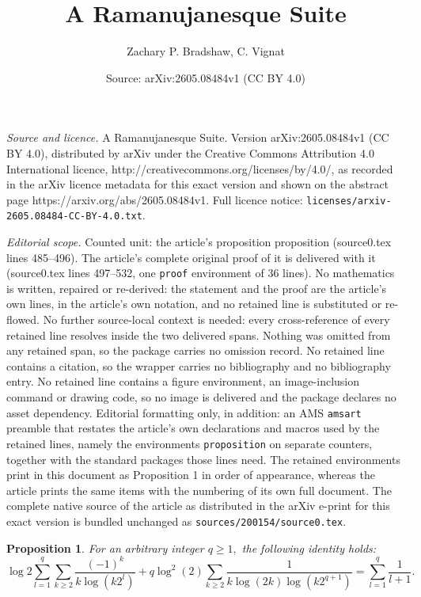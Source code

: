 \documentclass[10pt,a4paper]{amsart}
\title{A Ramanujanesque Suite}
\author{Zachary P. Bradshaw, C. Vignat}
\date{Source: arXiv:2605.08484v1 (CC BY 4.0)}
\newtheorem{proposition}{Proposition}
\begin{document}
\maketitle

\noindent\emph{Source and licence.} A Ramanujanesque Suite. Version arXiv:2605.08484v1 (CC BY 4.0), distributed by arXiv under the Creative Commons Attribution 4.0 International licence, http://creativecommons.org/licenses/by/4.0/, as recorded in the arXiv licence metadata for this exact version and shown on the abstract page https://arxiv.org/abs/2605.08484v1. Full licence notice: \texttt{licenses/arxiv-2605.08484-CC-BY-4.0.txt}.\par\smallskip

\noindent\textit{Editorial scope.} Counted unit: the article's proposition proposition (source0.tex lines 485--496). The article's complete original proof of it is delivered with it (source0.tex lines 497--532, one \texttt{proof} environment of 36 lines). No mathematics is written, repaired or re-derived: the statement and the proof are the article's own lines, in the article's own notation, and no retained line is substituted or re-flowed.  No further source-local context is needed: every cross-reference of every retained line resolves inside the two delivered spans.  Nothing was omitted from any retained span, so the package carries no omission record.  No retained line contains a citation, so the wrapper carries no bibliography and no bibliography entry.  No retained line contains a figure environment, an image-inclusion command or drawing code, so no image is delivered and the package declares no asset dependency.  Editorial formatting only, in addition: an AMS \texttt{amsart} preamble that restates the article's own declarations and macros used by the retained lines, namely the environments \texttt{proposition} on separate counters, together with the standard packages those lines need.  The retained environments print in this document as Proposition 1 in order of appearance, whereas the article prints the same items with the numbering of its own full document.  The complete native source of the article as distributed in the arXiv e-print for this exact version is bundled unchanged as \texttt{sources/200154/source0.tex}.
\begin{proposition}
For an arbitrary integer $q \ge 1,$ the following identity holds:
\begin{equation}
\log2 \sum_{l=1}^q
\sum_{k\ge2}\frac{\left(-1\right)^{k}}{k
\log\left(k2^l\right)}
+q\log^2(2)\sum_{k\ge2}\frac{1}{k
\log\left(2k\right)
\log\left(k2^{q+1}\right)}=\sum_{l=1}^q \frac{1}{l+1}.
\end{equation}

\end{proposition}
\end{document}
